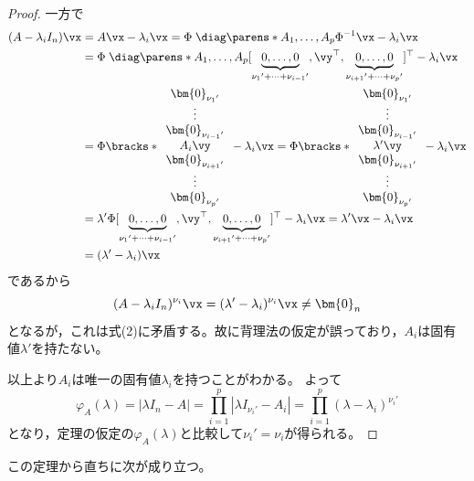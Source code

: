 \begin{proof}
                一方で
                \begin{align*}
                    (A-\lambda_iI_n)\vx &= A\vx - \lambda_i\vx = \Phi\;\diag\parens*{A_1,\dotsc,A_p}\Phi^{-1}\vx - \lambda_i\vx\\
                    &= \Phi\;\diag\parens*{A_1,\dotsc,A_p}[\underbrace{0,\dotsc,0}_{{\nu_1}'+\dotsb+{\nu_{i-1}}'},\vy^\top,\underbrace{0,\dotsc,0}_{{\nu_{i+1}}'+\dotsb+{\nu_p}'}]^\top - \lambda_i\vx\\
                    &= \Phi\bracks*{
                        \begin{array}{c}
                            \bm{0}_{{\nu_1}'}\\
                            \vdots\\
                            \bm{0}_{{\nu_{i-1}}'}\\
                            A_i\vy\\
                            \bm{0}_{{\nu_{i+1}}'}\\
                            \vdots\\
                            \bm{0}_{{\nu_p}'}\\
                        \end{array}
                    } - \lambda_i\vx = \Phi\bracks*{
                        \begin{array}{c}
                            \bm{0}_{{\nu_1}'}\\
                            \vdots\\
                            \bm{0}_{{\nu_{i-1}}'}\\
                            \lambda'\vy\\
                            \bm{0}_{{\nu_{i+1}}'}\\
                            \vdots\\
                            \bm{0}_{{\nu_p}'}\\
                        \end{array}
                    } - \lambda_i\vx\\
                    &= \lambda'\Phi[\underbrace{0,\dotsc,0}_{{\nu_1}'+\dotsb+{\nu_{i-1}}'},\vy^\top,\underbrace{0,\dotsc,0}_{{\nu_{i+1}}'+\dotsb+{\nu_p}'}]^\top - \lambda_i\vx = \lambda'\vx-\lambda_i\vx\\
                    &= (\lambda'-\lambda_i)\vx
                \end{align*}
                であるから
                \[(A-\lambda_iI_n)^{\nu_i}\vx = (\lambda'-\lambda_i)^{\nu_i}\vx \neq \bm{0}_n\]
                となるが，これは式(2)に矛盾する。故に背理法の仮定が誤っており，$A_i$は固有値$\lambda'$を持たない。
                \par
                以上より$A_i$は唯一の固有値$\lambda_i$を持つことがわかる。
                よって
                \[\varphi_A(\lambda) = |\lambda I_n - A| = \prod_{i=1}^{p}{|\lambda I_{{\nu_i}'} - A_i|} = \prod_{i=1}^{p}{(\lambda-\lambda_i)^{{\nu_i}'}}\]
                となり，定理の仮定の$\varphi_A(\lambda)$と比較して${\nu_i}'=\nu_i$が得られる。
            \end{proof}
        この定理から直ちに次が成り立つ。
